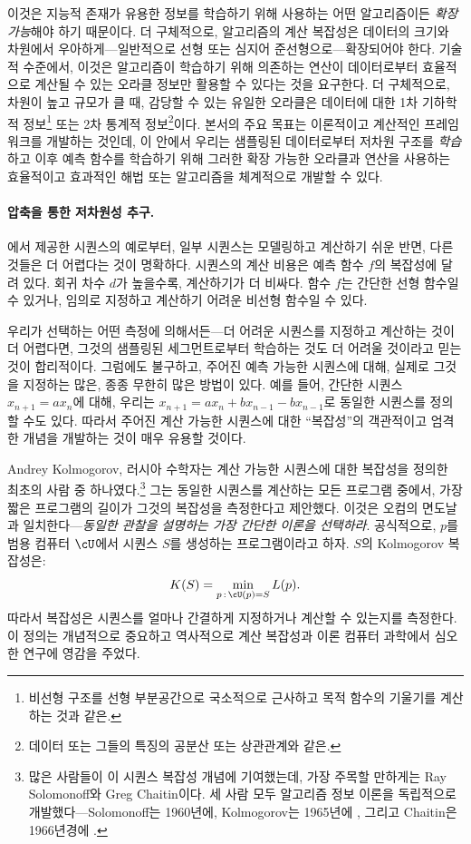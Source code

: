 \documentclass[../../book-main_ko.tex]{subfiles}
\begin{document}
이것은 지능적 존재가 유용한 정보를 학습하기 위해 사용하는 어떤 알고리즘이든 \textit{확장 가능}해야 하기 때문이다. 더 구체적으로, 알고리즘의 계산 복잡성은 데이터의 크기와 차원에서 우아하게---일반적으로 선형 또는 심지어 준선형으로---확장되어야 한다. 기술적 수준에서, 이것은 알고리즘이 학습하기 위해 의존하는 연산이 데이터로부터 효율적으로 계산될 수 있는 오라클 정보만 활용할 수 있다는 것을 요구한다. 더 구체적으로, 차원이 높고 규모가 클 때, 감당할 수 있는 유일한 오라클은 데이터에 대한 1차 기하학적 정보\footnote{비선형 구조를 선형 부분공간으로 국소적으로 근사하고 목적 함수의 기울기를 계산하는 것과 같은.} 또는 2차 통계적 정보\footnote{데이터 또는 그들의 특징의 공분산 또는 상관관계와 같은.}이다.
본서의 주요 목표는 이론적이고 계산적인 프레임워크를 개발하는 것인데, 이 안에서 우리는 샘플링된 데이터로부터 저차원 구조를 \textit{학습}하고 이후 예측 함수를 학습하기 위해 그러한 확장 가능한 오라클과 연산을 사용하는 효율적이고 효과적인 해법 또는 알고리즘을 체계적으로 개발할 수 있다.


\paragraph{압축을 통한 저차원성 추구.}
에서 제공한 시퀀스의 예로부터, 일부 시퀀스는 모델링하고 계산하기 쉬운 반면, 다른 것들은 더 어렵다는 것이 명확하다. 시퀀스의 계산 비용은 예측 함수 \(f\)의 복잡성에 달려 있다. 회귀 차수 \(d\)가 높을수록, 계산하기가 더 비싸다. 함수 \(f\)는 간단한 선형 함수일 수 있거나, 임의로 지정하고 계산하기 어려운 비선형 함수일 수 있다.

우리가 선택하는 어떤 측정에 의해서든---더 어려운 시퀀스를 지정하고 계산하는 것이 더 어렵다면, 그것의 샘플링된 세그먼트로부터 학습하는 것도 더 어려울 것이라고 믿는 것이 합리적이다. 그럼에도 불구하고, 주어진 예측 가능한 시퀀스에 대해, 실제로 그것을 지정하는 많은, 종종 무한히 많은 방법이 있다. 예를 들어, 간단한 시퀀스 \(x_{n+1} = a x_{n}\)에 대해, 우리는 \(x_{n+1} = a x_{n} + b x_{n-1} - b x_{n-1}\)로 동일한 시퀀스를 정의할 수도 있다.
따라서 주어진 계산 가능한 시퀀스에 대한 ``복잡성''의 객관적이고 엄격한 개념을 개발하는 것이 매우 유용할 것이다.

Andrey Kolmogorov, 러시아 수학자는 계산 가능한 시퀀스에 대한 복잡성을 정의한 최초의 사람 중 하나였다.\footnote{많은 사람들이 이 시퀀스 복잡성 개념에 기여했는데, 가장 주목할 만하게는 Ray Solomonoff와 Greg Chaitin이다. 세 사람 모두 알고리즘 정보 이론을 독립적으로 개발했다---Solomonoff는 1960년에, Kolmogorov는 1965년에 \cite{Kolmogorov1998OnTO}, 그리고 Chaitin은 1966년경에 \cite{Chaitin-1966}.} 그는 동일한 시퀀스를 계산하는 모든 프로그램 중에서, 가장 짧은 프로그램의 길이가 그것의 복잡성을 측정한다고 제안했다. 이것은 오컴의 면도날과 일치한다---\textit{동일한 관찰을 설명하는 가장 간단한 이론을 선택하라}. 공식적으로, \(p\)를 범용 컴퓨터 \(\cU\)에서 시퀀스 \(S\)를 생성하는 프로그램이라고 하자. \(S\)의 Kolmogorov 복잡성은:
\begin{equation}
    K(S) = \min_{p\,:\, \cU(p) = S} L(p).
\end{equation}
따라서 복잡성은 시퀀스를 얼마나 간결하게 지정하거나 계산할 수 있는지를 측정한다. 이 정의는 개념적으로 중요하고 역사적으로 계산 복잡성과 이론 컴퓨터 과학에서 심오한 연구에 영감을 주었다.
\end{document}
